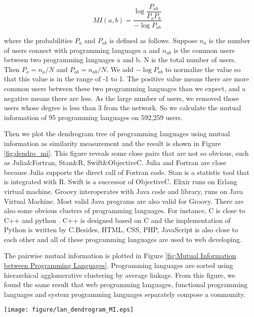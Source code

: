 \documentclass[12pt,oneside,final]{vlsithesis}
\begin{document}
\begin{equation}
	MI(a,b) = \dfrac{\log \dfrac{P_{ab}}{P_{a}P_{b}}}{-\log P_{ab}}
\end{equation}

where the probabilities $P_{a}$ and $P_{ab}$ is defined as follows. Suppose  $n_{a}$ is the number of users connect with programming languages a and $n_{ab}$ is the common users between two programming languages a and b. N is the total number of users. Then   $P_{a}= n_{a} / N $ and $P_{ab}=n_{ab}/N $. We add $-\log P_{ab}$ to normalize the value so that this value is in the range of -1 to 1. The positive value means there are more common users between these two programming languages than we expect, and a negative means there are less.  As the large number of users, we removed those users whose degree is less than 3 from the network. So we calculate the mutual information of 95 programming languages on 592,259 users. 

Then we plot the dendrogram tree of programming languages using mutual information as similarity measurement and the result is shown in Figure \ref{fig:dendro_mi}. This figure reveals some close pairs that are not so obvious, such as Julia\&Fortran, Stan\&R, Swift\&ObjectiveC. Julia and Fortran are close because Julia supports the direct call of Fortran code. Stan is a statistic tool that is integrated with R.  Swift is a successor of  ObjectiveC. Elixir runs on Erlang virtual machine. Groovy interoperates with Java code and library, runs on Java Virtual Machine.  Most valid Java programs are also valid for Groovy. There are also some obvious clusters of programming languages. For instance, C is close to C++ and python . C++ is designed based on C and the implementation of Python is written by C.Besides, HTML, CSS, PHP, JavaScript is also close to each other and all of these programming languages are used to web developing. 

The pairwise mutual information is plotted in Figure \ref{fig:Mutual Information between  Programming Languages}. Programming languages are sorted using hierarchical agglomerative clustering by average linkage. From this figure, we found the same result that web programming languages, functional programming languages and system programming languages separately compose a community. 

\begin{figure*}
	\centering
	\texttt{[image: figure/lan\_dendrogram\_MI.eps]}
	\caption{Clustering result using MI as similarity measurement}
	\label{fig:dendro_mi}
\end{figure*}
\end{document}
